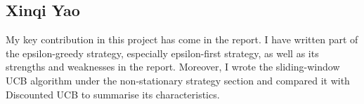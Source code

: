 \subsection{Xinqi Yao}\label{subsec:xinqi-yao}
My key contribution in this project has come in the report. 
I have written part of the epsilon-greedy strategy, especially epsilon-first strategy, as well as its strengths and weaknesses in the report.
Moreover, I wrote the sliding-window UCB algorithm under the non-stationary strategy section and compared it with Discounted UCB to summarise its characteristics.
